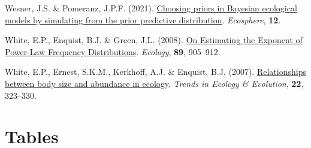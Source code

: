 \documentclass[
  12pt,
]{article}
\newlength{\cslhangindent}
\newlength{\cslentryspacingunit} %
\newenvironment{CSLReferences}[2] %
 {%
  \setlength{\parindent}{0pt}
  \ifodd #1
  \let\oldpar\par
  \def\par{\hangindent=\cslhangindent\oldpar}
  \fi
  \setlength{\parskip}{#2\cslentryspacingunit}
 }%
 {}
\begin{document}
\begin{CSLReferences}{1}{0}
\leavevmode{}%
Wesner, J.S. \& Pomeranz, J.P.F. (2021).
\href{https://doi.org/10.1002/ecs2.3739}{Choosing priors in {Bayesian}
ecological models by simulating from the prior predictive distribution}.
\emph{Ecosphere}, \textbf{12}.

\leavevmode{}%
White, E.P., Enquist, B.J. \& Green, J.L. (2008).
\href{https://doi.org/10.1890/07-1288.1}{On {Estimating} the {Exponent}
of {Power-Law Frequency Distributions}}. \emph{Ecology}, \textbf{89},
905--912.

\leavevmode{}%
White, E.P., Ernest, S.K.M., Kerkhoff, A.J. \& Enquist, B.J. (2007).
\href{https://doi.org/10.1016/j.tree.2007.03.007}{Relationships between
body size and abundance in ecology}. \emph{Trends in Ecology \&
Evolution}, \textbf{22}, 323--330.

\end{CSLReferences}

\newpage

\hypertarget{tables}{%
\section{Tables}\label{tables}}
\end{document}
